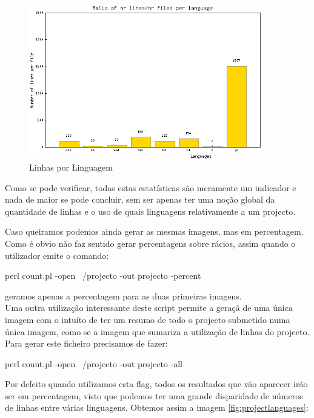 \begin{figure}[htbp]
\begin{center}
\includegraphics[width=0.9\textwidth]{Images/projecto_RatioFilesLines.png}
\caption{Linhas por Linguagem}\label{fig:ratiofileslines}
\end{center}
\end{figure}

Como se pode verificar, todas estas estatísticas são meramente um indicador e nada de maior se pode concluir, sem ser apenas ter uma noção global da quantidade de linhas
e o uso de quais linguagens relativamente a um projecto.

Caso queiramos podemos ainda gerar as mesmas imagens, mas em percentagem. Como é obvio não faz sentido gerar percentagens sobre rácios, assim quando o utilizador
emite o comando:

\begin{code_files}
perl count.pl -open ~/projecto -out projecto -percent
\end{code_files}

geramos apenas a percentagem para as duas primeiras imagens.\\

Uma outra utilização interessante deste script permite a geraçã de uma única imagem com o intuíto de ter um resumo de todo o projecto submetido numa única imagem, como
se a imagem que sumariza a utilização de linhas do projecto.\\
Para gerar este ficheiro precisamos de fazer:
\begin{code_files}
perl count.pl -open ~/projecto -out projecto -all
\end{code_files}
Por defeito quando utilizamos esta flag, todos os resultados que vão aparecer irão ser em percentagem, visto que podemos ter uma grande disparidade de números de
linhas entre várias linguagens. Obtemos assim a imagem \ref{fig:projectlanguages}:

